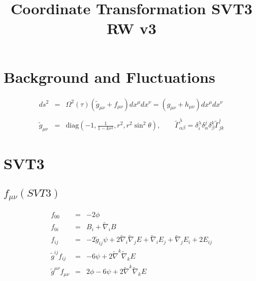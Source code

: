 \documentclass[10pt,letterpaper]{article}
\title{Coordinate Transformation SVT3 RW v3}
\date{}
\numberwithin{equation}{section}
\begin{document}
 
\maketitle
\noindent 

\section{Background and Fluctuations}
\begin{eqnarray}
ds^2 &=& \Omega^2(\tau)(\tilde g_{\mu\nu} + f_{\mu\nu})dx^\mu dx^\nu = (g_{\mu\nu} +h_{\mu\nu}) dx^\mu dx^\nu
\\ \nonumber\\
\tilde g_{\mu\nu} &=& \text{diag}\left(-1,\frac{1}{1-kr^2}, r^2, r^2\sin^2\theta\right),\qquad \tilde \Gamma^{\lambda}_{\alpha\beta} = \delta^\lambda_i \delta^j_\alpha \delta^k_\beta \tilde \Gamma^{i}_{jk}
\end{eqnarray}

\section{SVT3}
%
\subsection{$f_{\mu\nu}(SVT3)$}
\begin{eqnarray}
f_{00} &=& -2\phi
\nonumber\\
f_{0i} &=& B_i + \tilde\nabla_i B
\nonumber\\
f_{ij} &=& -2\tilde g_{ij} \psi + 2\tilde\nabla_i\tilde\nabla_j E + \tilde\nabla_i E_j + \tilde\nabla_j E_i + 2E_{ij}
\nonumber\\
\tilde g^{ij} f_{ij} &=& -6\psi + 2\tilde\nabla^k\tilde\nabla_k E
\nonumber\\
\tilde g^{\mu\nu} f_{\mu\nu} &=& 2\phi-6\psi + 2\tilde\nabla^k\tilde\nabla_k E
\end{eqnarray}

\end{document}
